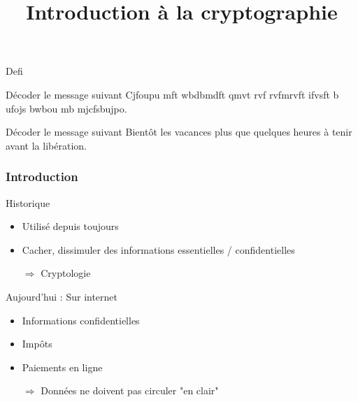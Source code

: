 \documentclass[xcolor={dvipsnames}]{beamer}
\title{Introduction à la cryptographie}
\begin{document}
%


\begin{frame}{Defi}
	\begin{block}{Décoder le message suivant}
		{\Large Cjfoupu mft wbdbmdft qmvt rvf rvfmrvft ifvsft b ufojs bwbou mb mjcfsbujpo.}\pause
	\end{block}

	\begin{block}{Décoder le message suivant}
		{\Large Bientôt les vacances plus que quelques heures à tenir avant la libération.}
	\end{block}	

\end{frame}


\begin{frame}
\frametitle{Introduction}	
	
	\begin{block}{Historique}
		\begin{itemize}
			\item Utilisé depuis toujours
			\item Cacher, dissimuler des informations essentielles / confidentielles%
			\item[$\Rightarrow$] Cryptologie
		\end{itemize}%
	\end{block}
	
	\begin{block}{Aujourd'hui : Sur internet}
		\begin{itemize}
			\item Informations confidentielles
			\item Impôts
			\item Paiements en ligne%
			\item[$\Rightarrow$] Données ne doivent pas circuler "en clair"
		\end{itemize}
	\end{block}
	
\end{frame}
\end{document}
